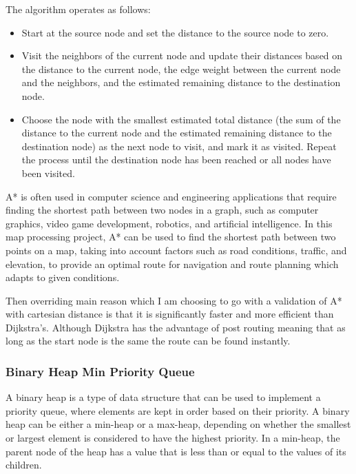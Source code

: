 \begin{FlushLeft}
    The algorithm operates as follows:
    \begin{itemize}
        \item Start at the source node and set the distance to the source node to zero.
        \item Visit the neighbors of the current node and update their distances based on the distance to the current node, the edge weight between the current node and the neighbors, and the estimated remaining distance to the destination node.
        \item Choose the node with the smallest estimated total distance (the sum of the distance to the current node and the estimated remaining distance to the destination node) as the next node to visit, and mark it as visited. Repeat the process until the destination node has been reached or all nodes have been visited.
    \end{itemize}

    A* is often used in computer science and engineering applications that require finding the shortest path between two nodes in a graph, such as computer graphics, video game development, robotics, and artificial intelligence. In this map processing project, A* can be used to find the shortest path between two points on a map, taking into account factors such as road conditions, traffic, and elevation, to provide an optimal route for navigation and route planning which adapts to given conditions. \\ \bk

    Then overriding main reason which I am choosing to go with a validation of A* with cartesian distance is that it is significantly faster and more efficient than Dijkstra's. Although Dijkstra has the advantage of post routing meaning that as long as the start node is the same the route can be found instantly. 
    \bk

    \subsubsection{Binary Heap Min Priority Queue}
    A binary heap is a type of data structure that can be used to implement a priority queue, where elements are kept in order based on their priority. A binary heap can be either a min-heap or a max-heap, depending on whether the smallest or largest element is considered to have the highest priority. In a min-heap, the parent node of the heap has a value that is less than or equal to the values of its children.\\ \bk


\end{FlushLeft}
